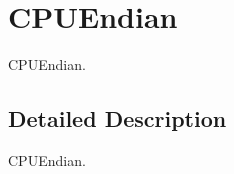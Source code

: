 \hypertarget{group__RTEMSScoreCPUV850CPUEndian}{}\section{C\+P\+U\+Endian}
\label{group__RTEMSScoreCPUV850CPUEndian}


C\+P\+U\+Endian.  




\subsection{Detailed Description}
C\+P\+U\+Endian. 

